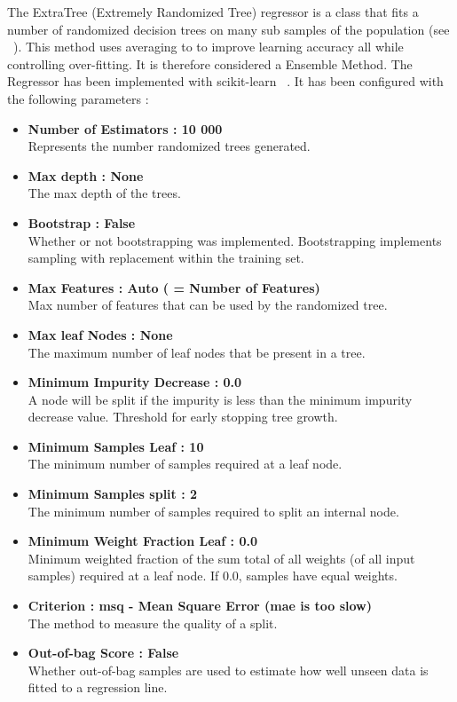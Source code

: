 \documentclass[a4paper,11pt]{report}
\numberwithin{figure}{chapter} %
\begin{document}
    The ExtraTree (Extremely Randomized Tree) regressor is a class that fits a number of randomized decision trees on many sub samples of the population (see ~\cite{extratree}).
    This method uses averaging to to improve learning accuracy all while controlling over-fitting.
    It is therefore considered a Ensemble Method.
    The Regressor has been implemented with scikit-learn ~\cite{scikit-learn}.
    It has been configured with the following parameters :
    \begin{itemize}
        \item[\textbullet] \textbf{Number of Estimators : 10 000}\\
        Represents the number randomized trees generated.
        \item[\textbullet] \textbf{Max depth : None}\\
        The max depth of the trees.
        \item[\textbullet] \textbf{Bootstrap : False}\\
        Whether or not bootstrapping was implemented.
        Bootstrapping implements sampling with replacement within the training set.
        \item[\textbullet] \textbf{Max Features : Auto ( = Number of Features)}\\
        Max number of features that can be used by the randomized tree.
        \item[\textbullet] \textbf{Max leaf Nodes : None}\\
        The maximum number of leaf nodes that be present in a tree.
        \item[\textbullet] \textbf{Minimum Impurity Decrease : 0.0}\\
        A node will be split if the impurity is less than the minimum impurity decrease value.
        Threshold for early stopping tree growth.
        \item[\textbullet] \textbf{Minimum Samples Leaf : 10}\\
        The minimum number of samples required at a leaf node.
        \item[\textbullet] \textbf{Minimum Samples split : 2}\\
        The minimum number of samples required to split an internal node.
        \item[\textbullet] \textbf{Minimum Weight Fraction Leaf : 0.0}\\
        Minimum weighted fraction of the sum total of all weights (of all input samples) required at a leaf node.
        If 0.0, samples have equal weights.
        \item[\textbullet] \textbf{Criterion : msq - Mean Square Error (mae is too slow)}\\
        The method to measure the quality of a split.
        \item[\textbullet] \textbf{Out-of-bag Score : False}\\
        Whether out-of-bag samples are used to estimate how well unseen data is fitted to a regression line.
    \end{itemize}
\end{document}
